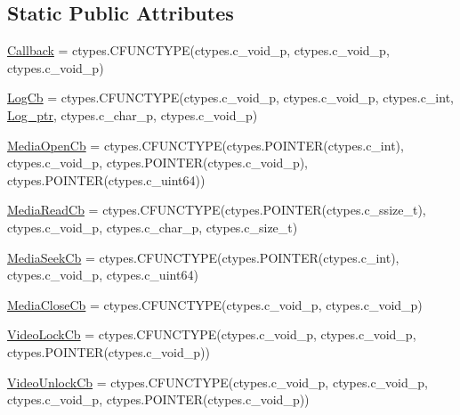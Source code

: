 \subsection*{Static Public Attributes}
\begin{DoxyCompactItemize}
\item 
\hyperlink{classvlc_1_1_callback_decorators_a01529b939dc98fd177206e0f8d4fe7e3}{Callback} = ctypes.\+C\+F\+U\+N\+C\+T\+Y\+PE(ctypes.\+c\+\_\+void\+\_\+p, ctypes.\+c\+\_\+void\+\_\+p, ctypes.\+c\+\_\+void\+\_\+p)
\item 
\hyperlink{classvlc_1_1_callback_decorators_a51572cccba5349df2ba20aac8de34581}{Log\+Cb} = ctypes.\+C\+F\+U\+N\+C\+T\+Y\+PE(ctypes.\+c\+\_\+void\+\_\+p, ctypes.\+c\+\_\+void\+\_\+p, ctypes.\+c\+\_\+int, \hyperlink{namespacevlc_a6a30cabf154659a9b4616bc59bf46b22}{Log\+\_\+ptr}, ctypes.\+c\+\_\+char\+\_\+p, ctypes.\+c\+\_\+void\+\_\+p)
\item 
\hyperlink{classvlc_1_1_callback_decorators_a0ee126d4a065c223433f8863e565fd4e}{Media\+Open\+Cb} = ctypes.\+C\+F\+U\+N\+C\+T\+Y\+PE(ctypes.\+P\+O\+I\+N\+T\+ER(ctypes.\+c\+\_\+int), ctypes.\+c\+\_\+void\+\_\+p, ctypes.\+P\+O\+I\+N\+T\+ER(ctypes.\+c\+\_\+void\+\_\+p), ctypes.\+P\+O\+I\+N\+T\+ER(ctypes.\+c\+\_\+uint64))
\item 
\hyperlink{classvlc_1_1_callback_decorators_aca52856f71fc585405744e5d29b1caff}{Media\+Read\+Cb} = ctypes.\+C\+F\+U\+N\+C\+T\+Y\+PE(ctypes.\+P\+O\+I\+N\+T\+ER(ctypes.\+c\+\_\+ssize\+\_\+t), ctypes.\+c\+\_\+void\+\_\+p, ctypes.\+c\+\_\+char\+\_\+p, ctypes.\+c\+\_\+size\+\_\+t)
\item 
\hyperlink{classvlc_1_1_callback_decorators_af2dc5de3d1c03f2465e664fa3ce80a12}{Media\+Seek\+Cb} = ctypes.\+C\+F\+U\+N\+C\+T\+Y\+PE(ctypes.\+P\+O\+I\+N\+T\+ER(ctypes.\+c\+\_\+int), ctypes.\+c\+\_\+void\+\_\+p, ctypes.\+c\+\_\+uint64)
\item 
\hyperlink{classvlc_1_1_callback_decorators_a15f9f636ac0e0af31c4615cc54c74057}{Media\+Close\+Cb} = ctypes.\+C\+F\+U\+N\+C\+T\+Y\+PE(ctypes.\+c\+\_\+void\+\_\+p, ctypes.\+c\+\_\+void\+\_\+p)
\item 
\hyperlink{classvlc_1_1_callback_decorators_a61e06dfa3da93e4c013c9491133c19aa}{Video\+Lock\+Cb} = ctypes.\+C\+F\+U\+N\+C\+T\+Y\+PE(ctypes.\+c\+\_\+void\+\_\+p, ctypes.\+c\+\_\+void\+\_\+p, ctypes.\+P\+O\+I\+N\+T\+ER(ctypes.\+c\+\_\+void\+\_\+p))
\item 
\hyperlink{classvlc_1_1_callback_decorators_aa5df1499fd4181cfb5ee5fd3d0eff991}{Video\+Unlock\+Cb} = ctypes.\+C\+F\+U\+N\+C\+T\+Y\+PE(ctypes.\+c\+\_\+void\+\_\+p, ctypes.\+c\+\_\+void\+\_\+p, ctypes.\+c\+\_\+void\+\_\+p, ctypes.\+P\+O\+I\+N\+T\+ER(ctypes.\+c\+\_\+void\+\_\+p))

\end{DoxyCompactItemize}
